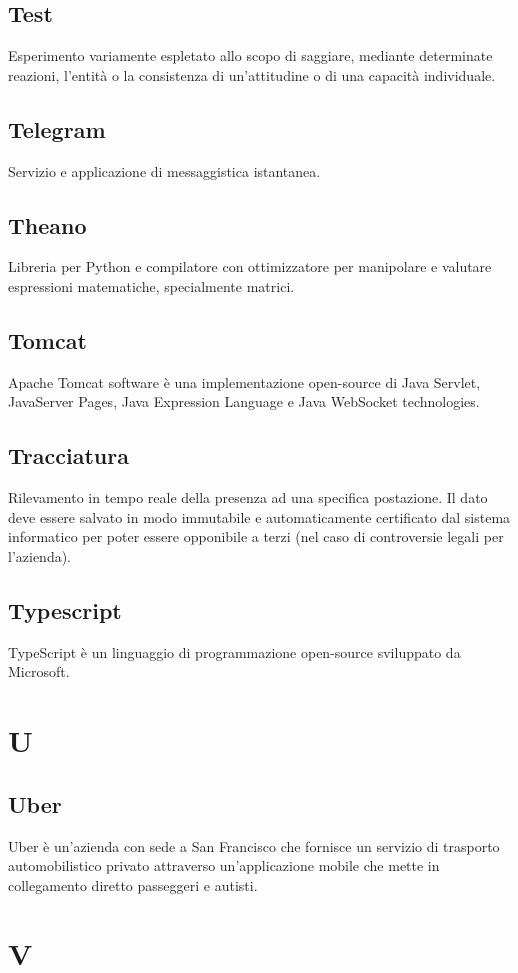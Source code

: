 \subsection{Test} Esperimento variamente espletato allo scopo di saggiare, mediante determinate reazioni, l'entità o la consistenza di un'attitudine o di una capacità individuale.
\subsection{Telegram} Servizio e applicazione di messaggistica istantanea.
\subsection{Theano} Libreria per Python e compilatore con ottimizzatore per manipolare e valutare espressioni matematiche, specialmente matrici.
\subsection{Tomcat} Apache Tomcat software è una implementazione open-source di Java Servlet, JavaServer Pages, Java Expression Language e Java WebSocket technologies.
\subsection{Tracciatura} Rilevamento in tempo reale della presenza ad una specifica
postazione. Il dato deve essere salvato in modo immutabile e automaticamente certificato dal
sistema informatico per poter essere opponibile a terzi (nel caso di controversie legali per l’azienda).
\subsection{Typescript} TypeScript è un linguaggio di programmazione open-source sviluppato da Microsoft.
\newpage \section{U}
\subsection{Uber} Uber è un'azienda con sede a San Francisco che fornisce un servizio di trasporto automobilistico privato attraverso un'applicazione mobile che mette in collegamento diretto passeggeri e autisti.
\newpage \section{V}
